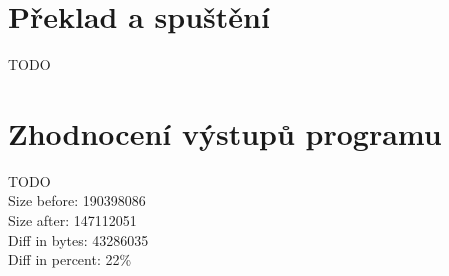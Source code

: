 \section{Překlad a spuštění}

TODO

\section{Zhodnocení výstupů programu}\label{Implementation:Results}

TODO\\


Size before:        190398086\\
Size after:         147112051\\         
Diff in bytes:      43286035\\            
Diff in percent:    22\%                 

